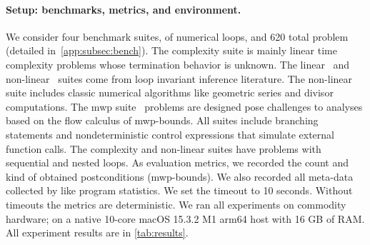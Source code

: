 \paragraph*{Setup: benchmarks, metrics, and environment.}\label{subsec:exp-setup}
We consider four benchmark suites, of numerical  loops, and 620 total problem (detailed in~\autoref{app:subsec:bench}).
The {complexity} suite is mainly linear time complexity problems whose termination behavior is unknown.
The {linear}~\cite{si2018} and {non-linear}~\cite{nguyen2017,yu2023} suites come from loop invariant inference literature.
The non-linear suite includes classic numerical algorithms like geometric series and divisor computations.
The {mwp} suite~\cite{aubert2023b} problems are designed pose challenges to analyses based on the flow calculus of mwp-bounds.
All suites include branching statements and nondeterministic control expressions that simulate external function calls.
The complexity and non-linear suites have problems with sequential and nested loops.
As evaluation metrics, we recorded the count and kind of obtained postconditions (\ie mwp-bounds).
We also recorded all meta-data collected by  like program statistics.
We set the timeout to 10 seconds.
Without timeouts the metrics are deterministic.
We ran all experiments on commodity hardware;
on a native 10-core macOS 15.3.2 M1 arm64 host with 16 GB of RAM\@.
All experiment results are in \autoref{tab:results}.

